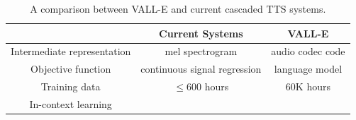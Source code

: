\documentclass{article}
\theoremstyle{plain}
\theoremstyle{definition}
\theoremstyle{remark}
\newcommand\our{\textsc{VALL-E}}
\newcommand{\cmark}{\ding{51}\xspace}%
\newcommand{\xmark}{\ding{55}\xspace}%
\begin{document}

\begin{table}[h]
\begin{center}
\caption{A comparison between \our{} and current cascaded TTS systems.}
\begin{tabular}{c|c|c}
\toprule
& \bf Current Systems  & \textbf{\our{}} \\  \hline
Intermediate representation & mel spectrogram   &   audio codec code \\ \hline
Objective function &  continuous signal regression & language model \\ \hline
Training data & $\leq 600$ hours   & 60K hours   \\ \hline
In-context learning & \xmark   & \cmark  \\
\bottomrule
\end{tabular}
\label{adv}
\end{center}
\end{table}

\end{document}
